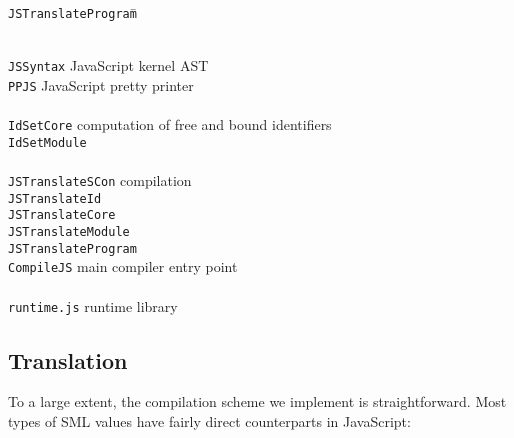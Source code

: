 \documentclass[twoside,titlepage]{article}
\begin{document}
\begin{quoting}
\begin{tabbing}
{\tt JSTranslateProgram}\qquad\= \kill

\hspace{-1em}{\tt compile-js/} \\
{\tt JSSyntax}			\> JavaScript kernel AST \\
{\tt PPJS}			\> JavaScript pretty printer \\
\\
{\tt IdSetCore}			\> computation of free and bound identifiers \\
{\tt IdSetModule}			\> \\
\\
{\tt JSTranslateSCon}			\> compilation \\
{\tt JSTranslateId}			\> \\
{\tt JSTranslateCore}			\> \\
{\tt JSTranslateModule}			\> \\
{\tt JSTranslateProgram}			\> \\
{\tt CompileJS}			\> main compiler entry point \\
\\
{\tt runtime.js}			\> runtime library \\
\end{tabbing}
\end{quoting}


\subsection{Translation}
\label{javascripttranslation}

To a large extent, the compilation scheme we implement is straightforward. Most types of SML values have fairly direct counterparts in JavaScript:
\end{document}
